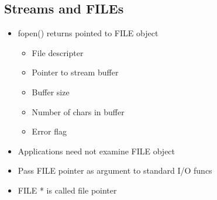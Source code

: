 \documentclass[10pt]{article}
\begin{document}
\begin{multicols}{2}
\begin{minipage}{\columnwidth}
\begin{flushright}
            \subsection*{Streams and FILEs}
            \begin{multicols*}{2}
                \begin{itemize}
                    \item fopen() returns pointed to FILE object
                          \begin{itemize}
                              \item File descripter
                              \item Pointer to stream buffer
                              \item Buffer size
                              \item Number of chars in buffer
                              \item Error flag
                          \end{itemize}
                          \columnbreak
                    \item Applications need not examine FILE object
                    \item Pass FILE pointer as argument to standard I/O funcs
                    \item FILE * is called file pointer
                \end{itemize}
            \end{multicols*}

\end{flushright}
\end{minipage}
\end{multicols}
\end{document}
